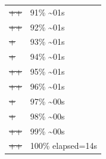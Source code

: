 \documentclass[12pt]{article}
\begin{document}
\begin{center}
\begin{tabular}{ll}
\sout{\sout{\sout{\sout{\sout{\sout{\sout{\sout{\sout{\sout{\sout{\sout{\sout{\sout{\sout{\sout{\sout{\sout{\sout{\sout{\sout{\sout{++}}}}}}}}}}}}}}}}}}}}}} & 91\% \textasciitilde{}01s\\
\sout{\sout{\sout{\sout{\sout{\sout{\sout{\sout{\sout{\sout{\sout{\sout{\sout{\sout{\sout{\sout{\sout{\sout{\sout{\sout{\sout{\sout{++}}}}}}}}}}}}}}}}}}}}}} & 92\% \textasciitilde{}01s\\
\sout{\sout{\sout{\sout{\sout{\sout{\sout{\sout{\sout{\sout{\sout{\sout{\sout{\sout{\sout{\sout{\sout{\sout{\sout{\sout{\sout{\sout{\sout{+}}}}}}}}}}}}}}}}}}}}}}} & 93\% \textasciitilde{}01s\\
\sout{\sout{\sout{\sout{\sout{\sout{\sout{\sout{\sout{\sout{\sout{\sout{\sout{\sout{\sout{\sout{\sout{\sout{\sout{\sout{\sout{\sout{\sout{+}}}}}}}}}}}}}}}}}}}}}}} & 94\% \textasciitilde{}01s\\
\sout{\sout{\sout{\sout{\sout{\sout{\sout{\sout{\sout{\sout{\sout{\sout{\sout{\sout{\sout{\sout{\sout{\sout{\sout{\sout{\sout{\sout{\sout{++}}}}}}}}}}}}}}}}}}}}}}} & 95\% \textasciitilde{}01s\\
\sout{\sout{\sout{\sout{\sout{\sout{\sout{\sout{\sout{\sout{\sout{\sout{\sout{\sout{\sout{\sout{\sout{\sout{\sout{\sout{\sout{\sout{\sout{++}}}}}}}}}}}}}}}}}}}}}}} & 96\% \textasciitilde{}01s\\
\sout{\sout{\sout{\sout{\sout{\sout{\sout{\sout{\sout{\sout{\sout{\sout{\sout{\sout{\sout{\sout{\sout{\sout{\sout{\sout{\sout{\sout{\sout{\sout{+}}}}}}}}}}}}}}}}}}}}}}}} & 97\% \textasciitilde{}00s\\
\sout{\sout{\sout{\sout{\sout{\sout{\sout{\sout{\sout{\sout{\sout{\sout{\sout{\sout{\sout{\sout{\sout{\sout{\sout{\sout{\sout{\sout{\sout{\sout{+}}}}}}}}}}}}}}}}}}}}}}}} & 98\% \textasciitilde{}00s\\
\sout{\sout{\sout{\sout{\sout{\sout{\sout{\sout{\sout{\sout{\sout{\sout{\sout{\sout{\sout{\sout{\sout{\sout{\sout{\sout{\sout{\sout{\sout{\sout{++}}}}}}}}}}}}}}}}}}}}}}}} & 99\% \textasciitilde{}00s\\
\sout{\sout{\sout{\sout{\sout{\sout{\sout{\sout{\sout{\sout{\sout{\sout{\sout{\sout{\sout{\sout{\sout{\sout{\sout{\sout{\sout{\sout{\sout{\sout{++}}}}}}}}}}}}}}}}}}}}}}}} & 100\% elapsed=14s\\
\end{tabular}
\end{center}
\begin{verbatim}

\end{verbatim}
\end{document}
